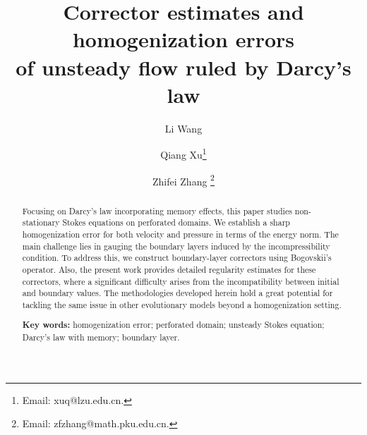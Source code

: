 \documentclass[13pt,CJK]{article}
\theoremstyle{plain}                       %
\theoremstyle{remark}
\numberwithin{equation}{section}
\begin{document}
\allowdisplaybreaks

\author[a,b]{Li Wang
}

\author[a]{Qiang Xu\thanks{Email: xuq@lzu.edu.cn.}
}

\author[b]{Zhifei Zhang \thanks{Email: zfzhang@math.pku.edu.cn.}
}
%




%



\title{\textbf{Corrector estimates and homogenization errors\\
of unsteady flow ruled by Darcy's law}}

\maketitle
\begin{abstract}
Focusing on Darcy’s law incorporating memory effects, this paper studies non-stationary Stokes equations on perforated domains.
We establish a sharp homogenization error for both velocity and pressure
in terms of the energy norm. The main challenge lies in gauging the boundary layers induced by the incompressibility condition.
To address this, we construct boundary-layer correctors using Bogovskii's operator. Also,
the present work provides detailed regularity estimates for these    correctors, where a significant difficulty arises from the incompatibility between initial and boundary values. The methodologies developed herein hold a great potential for tackling the same issue in other evolutionary models beyond a homogenization setting.

\smallskip
\noindent
\textbf{Key words:}
homogenization error; perforated domain;
unsteady Stokes equation; Darcy's law with memory;
boundary layer.
\end{abstract}
\end{document}
